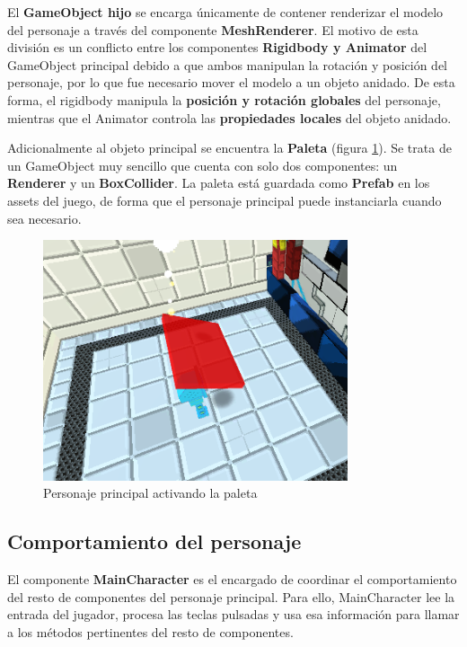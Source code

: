 El \textbf{GameObject hijo} se encarga únicamente de contener renderizar el modelo del personaje a través del componente \textbf{MeshRenderer}. El motivo de esta división es un conflicto entre los componentes \textbf{Rigidbody y Animator} del GameObject principal debido a que ambos manipulan la rotación y posición del personaje, por lo que fue necesario mover el modelo a un objeto anidado. De esta forma, el rigidbody manipula la \textbf{posición y rotación globales} del personaje, mientras que el Animator controla las \textbf{propiedades locales} del objeto anidado.

Adicionalmente al objeto principal se encuentra la \textbf{Paleta} (figura \ref{paddle}). Se trata de un GameObject muy sencillo que cuenta con solo dos componentes: un \textbf{Renderer} y un \textbf{BoxCollider}. La paleta está guardada como \textbf{Prefab} en los assets del juego, de forma que el personaje principal puede instanciarla cuando sea necesario.
\begin{figure}[h]
	\includegraphics[width=0.8\textwidth]{images/estructura/personaje/flick_paddle}
	\centering
	\caption{Personaje principal activando la paleta}
	\label{paddle}
\end{figure}

\subsection{Comportamiento del personaje}
El componente \textbf{MainCharacter} es el encargado de coordinar el comportamiento del resto de componentes del personaje principal. Para ello, MainCharacter lee la entrada del jugador, procesa las teclas pulsadas y usa esa información para llamar a los métodos pertinentes del resto de componentes.  

